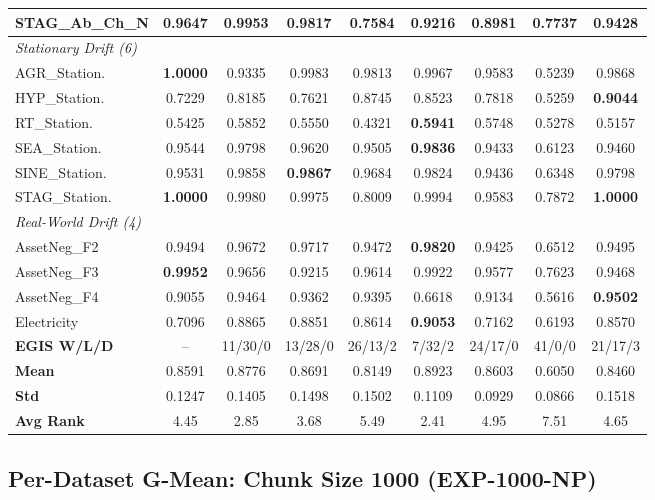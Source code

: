 \documentclass[lettersize,10pt]{article}
\begin{document}
\begin{longtable}{lcccccccc}
STAG\_Ab\_Ch\_N & 0.9647 & \textbf{0.9953} & 0.9817 & 0.7584 & 0.9216 & 0.8981 & 0.7737 & 0.9428 \\
\midrule \multicolumn{9}{l}{\textit{Stationary Drift (6)}}\\
\midrule
AGR\_Station. & \textbf{1.0000} & 0.9335 & 0.9983 & 0.9813 & 0.9967 & 0.9583 & 0.5239 & 0.9868 \\
HYP\_Station. & 0.7229 & 0.8185 & 0.7621 & 0.8745 & 0.8523 & 0.7818 & 0.5259 & \textbf{0.9044} \\
RT\_Station. & 0.5425 & 0.5852 & 0.5550 & 0.4321 & \textbf{0.5941} & 0.5748 & 0.5278 & 0.5157 \\
SEA\_Station. & 0.9544 & 0.9798 & 0.9620 & 0.9505 & \textbf{0.9836} & 0.9433 & 0.6123 & 0.9460 \\
SINE\_Station. & 0.9531 & 0.9858 & \textbf{0.9867} & 0.9684 & 0.9824 & 0.9436 & 0.6348 & 0.9798 \\
STAG\_Station. & \textbf{1.0000} & 0.9980 & 0.9975 & 0.8009 & 0.9994 & 0.9583 & 0.7872 & \textbf{1.0000} \\
\midrule \multicolumn{9}{l}{\textit{Real-World Drift (4)}}\\
\midrule
AssetNeg\_F2 & 0.9494 & 0.9672 & 0.9717 & 0.9472 & \textbf{0.9820} & 0.9425 & 0.6512 & 0.9495 \\
AssetNeg\_F3 & \textbf{0.9952} & 0.9656 & 0.9215 & 0.9614 & 0.9922 & 0.9577 & 0.7623 & 0.9468 \\
AssetNeg\_F4 & 0.9055 & 0.9464 & 0.9362 & 0.9395 & 0.6618 & 0.9134 & 0.5616 & \textbf{0.9502} \\
Electricity & 0.7096 & 0.8865 & 0.8851 & 0.8614 & \textbf{0.9053} & 0.7162 & 0.6193 & 0.8570 \\
\midrule
\textbf{EGIS W/L/D} & -- & 11/30/0 & 13/28/0 & 26/13/2 & 7/32/2 & 24/17/0 & 41/0/0 & 21/17/3 \\
\textbf{Mean} & 0.8591 & 0.8776 & 0.8691 & 0.8149 & 0.8923 & 0.8603 & 0.6050 & 0.8460 \\
\textbf{Std} & 0.1247 & 0.1405 & 0.1498 & 0.1502 & 0.1109 & 0.0929 & 0.0866 & 0.1518 \\
\textbf{Avg Rank} & 4.45 & 2.85 & 3.68 & 5.49 & 2.41 & 4.95 & 7.51 & 4.65 \\
\bottomrule
\end{longtable}
\normalsize

\subsection{Per-Dataset G-Mean: Chunk Size 1000 (EXP-1000-NP)}
\label{sec:s2_exp_1000_np}
\end{document}
